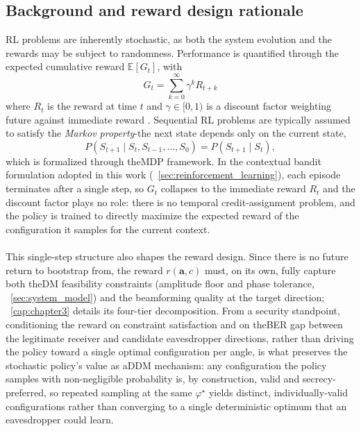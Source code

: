 \subsection{Background and reward design rationale}
\gls{RL} problems are inherently stochastic, as both the system evolution and the rewards may be subject to randomness. Performance is quantified through the expected cumulative reward $\mathbb{E}[G_t]$, with
\begin{equation}
    G_t = \sum_{k=0}^{\infty} \gamma^k R_{t+k}
\end{equation}
where $R_t$ is the reward at time $t$ and $\gamma \in [0,1)$ is a discount factor weighting future against immediate reward \cite{ross2019probability}. Sequential RL problems are typically assumed to satisfy the \emph{Markov property}-the next state depends only on the current state,
\begin{equation}
    P(S_{t+1} \mid S_t, S_{t-1}, \dots, S_0) = P(S_{t+1} \mid S_t),
\end{equation}
which is formalized through the\gls{MDP} framework. In the contextual bandit formulation adopted in this work (\sectionname~\ref{sec:reinforcement_learning}), each episode terminates after a single step, so $G_t$ collapses to the immediate reward $R_t$ and the discount factor plays no role: there is no temporal credit-assignment problem, and the policy is trained to directly maximize the expected reward of the configuration it samples for the current context.\\
\\
This single-step structure also shapes the reward design. Since there is no future return to bootstrap from, the reward $r(\mathbf{a}, c)$ must, on its own, fully capture both the\gls{DM} feasibility constraints (amplitude floor and phase tolerance, \sectionname~\ref{sec:system_model}) and the beamforming quality at the target direction; \chaptername~\ref{cap:chapter3} details its four-tier decomposition. From a security standpoint, conditioning the reward on constraint satisfaction and on the\gls{BER} gap between the legitimate receiver and candidate eavesdropper directions, rather than driving the policy toward a single optimal configuration per angle, is what preserves the stochastic policy's value as a\gls{DDM} mechanism: any configuration the policy samples with non-negligible probability is, by construction, valid and secrecy-preferred, so repeated sampling at the same $\varphi^\star$ yields distinct, individually-valid configurations rather than converging to a single deterministic optimum that an eavesdropper could learn.

